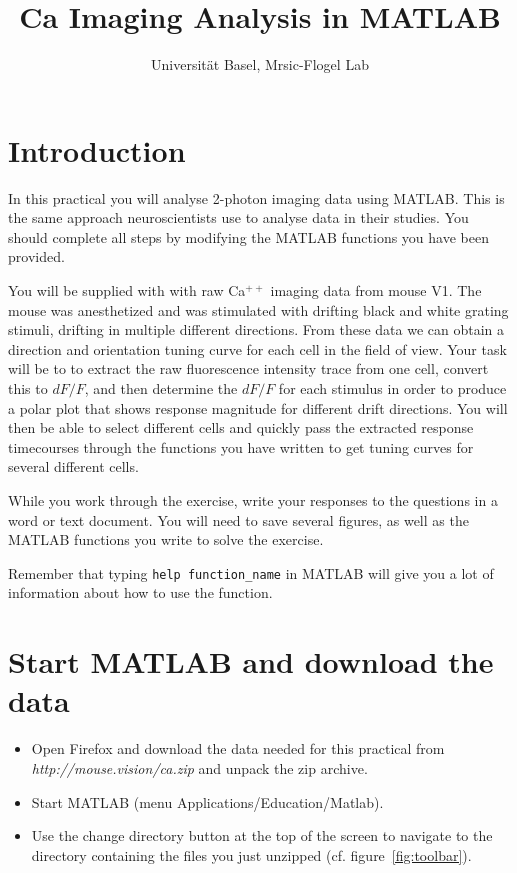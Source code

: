 \documentclass[paper=a4, fontsize=11pt]{article} %
\title{Ca\supr{++} Imaging Analysis in MATLAB}
\author{Universit\"{a}t Basel, Mrsic-Flogel Lab}
\date{}
\numberwithin{equation}{section} %
\numberwithin{figure}{section} %
\numberwithin{table}{section} %
\newcommand{\supr}[1]{\ensuremath{^{#1}}}
\begin{document}
\maketitle %

\section*{Introduction}

In this practical you will analyse 2-photon imaging data using MATLAB. This is the same approach 
neuroscientists use to analyse data in their studies. You should complete all steps by modifying the 
MATLAB functions you have been provided.

You will be supplied with with raw Ca\supr{++} imaging data from mouse V1. The mouse 
was anesthetized and was stimulated with drifting black and white grating stimuli, drifting in multiple different directions. From these data
we can obtain a direction and orientation tuning curve for each cell in the field of view. Your task will be to to 
extract the raw fluorescence intensity trace from one cell, convert this to $dF/F$, and then 
determine the $dF/F$ for each stimulus in order to produce a polar plot that shows response magnitude
for different drift directions. You will then be able to select different cells and quickly pass the extracted 
response timecourses through the functions you have written to get tuning curves for several 
different cells. 

While you work through the exercise, write your responses to the questions in a word or text document. You will need to save several figures, as well as the MATLAB functions you write to solve the exercise.

Remember that typing \texttt{help function\_name} in MATLAB will give you a lot of information about how to use the function.


\section{Start MATLAB and download the data}
\begin{itemize}
\setlength{\parskip}{0.25em}
\item Open Firefox and download the data needed for this practical from \textit{http://mouse.vision/ca.zip} and unpack the zip archive.
\item Start MATLAB (menu Applications/Education/Matlab).
\item Use the change directory button at the top of the screen to navigate to the 
  directory containing the files you just unzipped (cf. figure~\ref{fig:toolbar}). 
\end{itemize}
\end{document}
